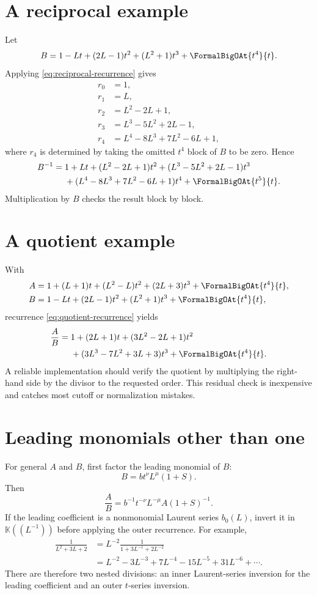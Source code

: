 \documentclass[11pt,oneside]{book}
\theoremstyle{definition}
\theoremstyle{remark}
\newcommand{\K}{\mathbb K}
\begin{document}
\section{A reciprocal example}
Let
\[
 B=1-Lt+(2L-1)t^2+(L^2+1)t^3+\FormalBigOAt{t^4}{t}.
\]
Applying \eqref{eq:reciprocal-recurrence} gives
\begin{align*}
 r_0&=1,\\
 r_1&=L,\\
 r_2&=L^2-2L+1,\\
 r_3&=L^3-5L^2+2L-1,\\
 r_4&=L^4-8L^3+7L^2-6L+1,
\end{align*}
where $r_4$ is determined by taking the omitted $t^4$ block of $B$ to be
zero.  Hence
\begin{align}\label{eq:reciprocal-example}
 B^{-1}={}&1+Lt+(L^2-2L+1)t^2
 +(L^3-5L^2+2L-1)t^3\notag\\
 &+(L^4-8L^3+7L^2-6L+1)t^4+\FormalBigOAt{t^5}{t}.
\end{align}
Multiplication by $B$ checks the result block by block.

\section{A quotient example}
With
\begin{align*}
 A&=1+(L+1)t+(L^2-L)t^2+(2L+3)t^3+\FormalBigOAt{t^4}{t},\\
 B&=1-Lt+(2L-1)t^2+(L^2+1)t^3+\FormalBigOAt{t^4}{t},
\end{align*}
recurrence \eqref{eq:quotient-recurrence} yields
\begin{align}\label{eq:quotient-example}
 \frac AB={}&1+(2L+1)t+(3L^2-2L+1)t^2\notag\\
 &+(3L^3-7L^2+3L+3)t^3+\FormalBigOAt{t^4}{t}.
\end{align}
A reliable implementation should verify the quotient by multiplying the
right-hand side by the divisor to the requested order.  This residual check
is inexpensive and catches most cutoff or normalization mistakes.

\section{Leading monomials other than one}
For general $A$ and $B$, first factor the leading monomial of $B$:
\[
 B=b t^\nu L^\mu(1+S).
\]
Then
\[
 \frac AB=b^{-1}t^{-\nu}L^{-\mu}A(1+S)^{-1}.
\]
If the leading coefficient is a nonmonomial Laurent series $b_0(L)$, invert
it in $\K((L^{-1}))$ before applying the outer recurrence.  For example,
\begin{align*}
 \frac{1}{L^2+3L+2}
 &=L^{-2}\frac1{1+3L^{-1}+2L^{-2}}\\
 &=L^{-2}-3L^{-3}+7L^{-4}-15L^{-5}+31L^{-6}+\cdots.
\end{align*}
There are therefore two nested divisions: an inner Laurent-series inversion
for the leading coefficient and an outer $t$-series inversion.
\end{document}
